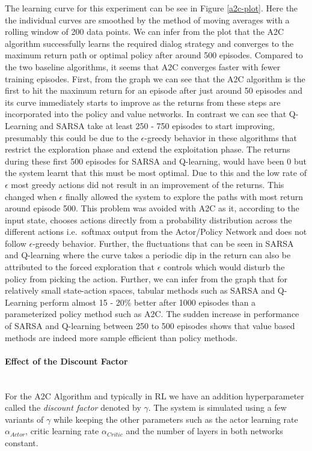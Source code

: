 \documentclass[12pt]{extarticle}
\newcommand{\myparagraph}[1]{\paragraph{#1}\mbox{}\\ \linebreak}
\numberwithin{equation}{section}
\begin{document}
	The learning curve for this experiment can be see in Figure \ref{a2c-plot}. Here the the individual curves are smoothed by the method of moving averages with a rolling window of 200 data points. We can infer from the plot that the A2C algorithm successfully learns the required dialog strategy and converges to the maximum return path or optimal policy after around 500 episodes. Compared to the two baseline algorithms, it seems that A2C converges faster with fewer training episodes. 
	First, from the graph we can see that the A2C algorithm is the first to hit the maximum return for an episode after just around 50 episodes and its curve immediately starts to improve as the returns from these steps are incorporated into the policy and value networks. In contrast we can see that Q-Learning and SARSA take at least 250 - 750 episodes to start improving, presumably this could be due to the $\epsilon$-greedy behavior in these algorithms that restrict the exploration phase and extend the exploitation phase. The returns during these first 500 episodes for SARSA and Q-learning, would have been 0 but the system learnt that this must be most optimal. Due to this and the low rate of $\epsilon$ most greedy actions did not result in an improvement of the returns. This changed when $\epsilon$ finally allowed the system to explore the paths with most return around episode 500. This problem was avoided with A2C as it, according to the input state, chooses actions directly from a probability distribution across the different actions i.e.\ softmax output from the Actor/Policy Network and does not follow $\epsilon$-greedy behavior. Further, the fluctuations that can be seen in SARSA and Q-learning where the curve takes a periodic dip in the return can also be attributed to the forced exploration that $\epsilon$ controls which would disturb the policy from picking the action. Further, we can infer from the graph that for relatively small state-action spaces, tabular methods such as SARSA and Q-Learning perform almost 15 - 20\% better after 1000 episodes than a parameterized policy method such as A2C. The sudden increase in performance of SARSA and Q-learning between 250 to 500 episodes shows that value based methods are indeed more sample efficient than policy methods.
	\myparagraph{Effect of the Discount Factor}\label{a2c_df_effect}
	For the A2C Algorithm and typically in RL we have an addition hyperparameter called the \textit{discount factor} denoted by $\gamma$. The system is simulated using a few variants of $\gamma$ while keeping the other parameters such as the actor learning rate $\alpha_{Actor}$, critic learning rate $\alpha_{Critic}$ and the number of layers in both networks constant. 
\end{document}

